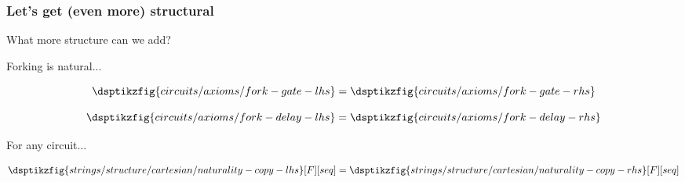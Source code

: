 \begin{frame}
    \frametitle{Let's get (even more) structural}

    What more structure can we add?

    \wait

    \alert{Forking} is natural...

    \wait

    \begin{axiom}
        \begin{minipage}{0.33\textwidth}
            \begin{equation*}
                \dsptikzfig{circuits/axioms/fork-gate-lhs}
                =
                \dsptikzfig{circuits/axioms/fork-gate-rhs}
            \end{equation*}
        \end{minipage}
        \begin{minipage}{0.33\textwidth}
            \begin{equation*}
                \dsptikzfig{circuits/axioms/fork-delay-lhs}
                =
                \dsptikzfig{circuits/axioms/fork-delay-rhs}
            \end{equation*}
        \end{minipage}
    \end{axiom}

    For any circuit...

    \begin{equation*}
        \dsptikzfig{strings/structure/cartesian/naturality-copy-lhs}[F][seq]
        =
        \dsptikzfig{strings/structure/cartesian/naturality-copy-rhs}[F][seq]
    \end{equation*}
\end{frame}
